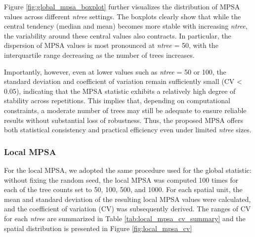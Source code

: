 \documentclass[
  a4paper,
  12pt]{article}
\begin{document}
Figure \ref{fig:global_mpsa_boxplot} further visualizes the distribution
of MPSA values across different \emph{ntree} settings. The boxplots
clearly show that while the central tendency (median and mean) becomes
more stable with increasing \emph{ntree}, the variability around these
central values also contracts. In particular, the dispersion of MPSA
values is most pronounced at \emph{ntree} = 50, with the interquartile
range decreasing as the number of trees increases.

Importantly, however, even at lower values such as \emph{ntree} = 50 or
100, the standard deviation and coefficient of variation remain
sufficiently small (CV \textless{} 0.05), indicating that the MPSA
statistic exhibits a relatively high degree of stability across
repetitions. This implies that, depending on computational constraints,
a moderate number of trees may still be adequate to ensure reliable
results without substantial loss of robustness. Thus, the proposed MPSA
offers both statistical consistency and practical efficiency even under
limited \emph{ntree} sizes.

\subsubsection{Local MPSA}\label{local-mpsa}

For the local MPSA, we adopted the same procedure used for the global
statistic: without fixing the random seed, the local MPSA was computed
100 times for each of the tree counts set to 50, 100, 500, and 1000. For
each spatial unit, the mean and standard deviation of the resulting
local MPSA values were calculated, and the coefficient of variation (CV)
was subsequently derived. The ranges of CV for each \emph{ntree} are
summarized in Table \ref{tab:local_mpsa_cv_summary} and the spatial
distribution is presented in Figure \ref{fig:local_mpsa_cv}

\vspace{1em}
\end{document}
